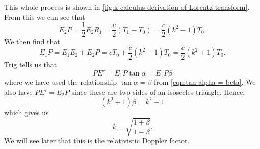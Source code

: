 \documentclass[fleqn]{NotesClass}
\begin{document}
    This whole process is shown in \cref{fig:k calculus derivation of Lorentz transform}.
    From this we can see that
    \begin{equation}
        E_2P = \frac{1}{2}E_2R_1 = \frac{c}{2}(T_1 - T_0) = \frac{c}{2}(k^2 - 1)T_0.
    \end{equation}
    We then find that
    \begin{equation}
        E_1P = E_1E_2 + E_2P = cT_0 + \frac{c}{2}(k^2 - 1)T_0 = \frac{c}{2}(k^2 + 1)T_0.
    \end{equation}
    Trig tells us that 
    \begin{equation}
        PE' = E_1P\tan\alpha = E_1 P \beta
    \end{equation}
    where we have used the relationship \(\tan\alpha = \beta\) from \cref{eqn:tan alpha = beta}.
    We also have \(PE' = E_2P\) since these are two sides of an isosceles triangle.
    Hence,
    \begin{equation}
        (k^2 + 1)\beta = k^2 - 1
    \end{equation}
    which gives us
    \begin{equation}
        k = \sqrt{\frac{1 + \beta}{1 - \beta}}.
    \end{equation}
    We will see later that this is the relativistic Doppler factor.
    
\end{document}
